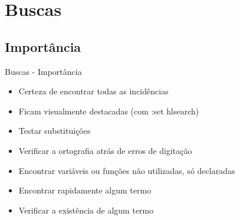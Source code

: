 \section{Buscas}
\subsection{Importância}
\begin{frame}{Buscas - Importância}
	\begin{itemize}
		\item Certeza de encontrar todas as incidências
		\item Ficam visualmente destacadas (com :set hlsearch)
		\item Testar substituições
		\item Verificar a ortografia atrás de erros de digitação
		\item Encontrar variáveis ou funções não utilizadas, só declaradas
		\item Encontrar rapidamente algum termo
		\item Verificar a existência de algum termo
	\end{itemize}
\end{frame}

